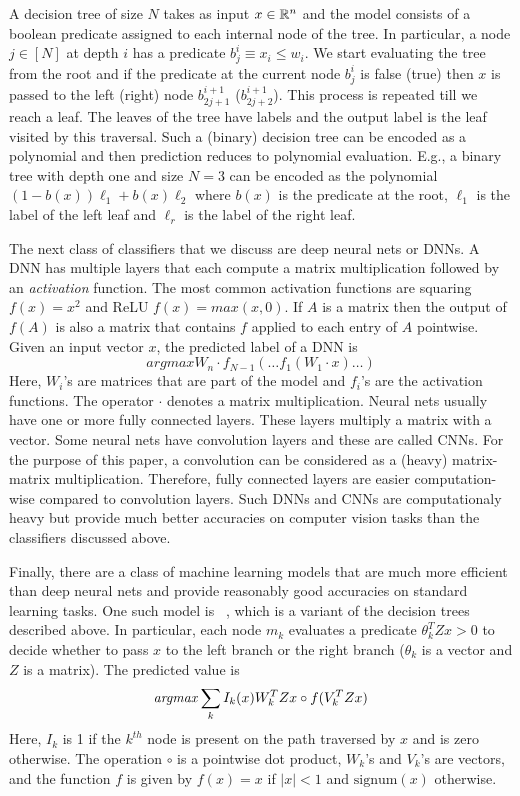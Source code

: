 A decision tree of size $N$ takes as input $x\in{\mathbb{R}}^n$ and the model consists of a boolean predicate
assigned to each internal node of the tree. In particular, a node $j\in[N]$ at depth $i$ has a predicate $b_{j}^i\equiv x_i\leq w_i$. We start evaluating the tree from the root and if the predicate at the current node $b_j^i$ is false (true) then $x$ is passed to the left (right) node $b_{2j+1}^{i+1}$ ($b_{2j+2}^{i+1}$). This process is repeated till we reach a leaf. The leaves of the tree have labels and the output label is the leaf visited by this traversal.
Such a (binary) decision tree can be encoded as a polynomial and then prediction
reduces to polynomial evaluation. E.g., a binary tree with depth one and size $N=3$ can be encoded as the polynomial
$(1-b(x))\ell_1 + b(x)\ell_2$ where $b(x)$ is the predicate at the root, $\ell_1$ is the label of the left leaf and $\ell_r$ is the label of the right leaf.

The next class of classifiers that we discuss are deep neural nets or DNNs. 
A DNN has multiple layers that each compute a matrix multiplication followed by
an {\it activation} function. The most common activation functions are 
squaring $f(x)=x^2$ and ReLU $f(x)=\mathit{max}(x,0)$. 
If $A$ is a matrix then the output of $f(A)$ is also a matrix that contains $f$  applied
 to each entry of $A$ pointwise.
Given an input vector $x$, the predicted label of a DNN is
\[
 \mathit{argmax} W_n\cdot f_{N-1}(\ldots f_1(W_1\cdot x)\ldots)
\]
Here, $W_i$'s are matrices that are part of the model and $f_i$'s are the activation functions.
The operator $\cdot$ denotes a matrix multiplication.
Neural nets usually have one or more fully connected layers.
These layers multiply a matrix with a vector.
Some neural nets have convolution layers and these are called CNNs.
For the purpose of this paper, a convolution can be considered as a (heavy) matrix-matrix multiplication. Therefore, fully connected layers are easier computation-wise compared
to convolution layers. Such DNNs and CNNs are computationaly heavy but provide
much better accuracies on computer vision tasks than the classifiers discussed above. 

Finally, there are a class of machine learning models that are much more efficient than
deep neural nets and provide reasonably good accuracies on standard learning tasks. One such model
is \bonsai~\cite{bonsai}, which is a variant of the decision trees described above.
In particular, each node $m_k$ evaluates a predicate $\theta_k^TZx > 0$ to decide whether
to pass $x$ to the left branch or the right branch ($\theta_k$ is a vector and $Z$ is a matrix).
The predicted value is
\[
{\it argmax} \sum_k I_k(x)W_k^TZx\circ f(V_k^TZx) 
\]
Here, $I_k$ is 1 if the $k^{th}$ node is present on the path traversed by $x$
and is zero otherwise. 
The operation $\circ$ is a pointwise dot product, $W_k$'s and $V_k$'s are vectors,  and
the function $f$ is given by $f(x) = x$ if $|x| < 1$ and $\mathrm{signum}(x)$ otherwise.

